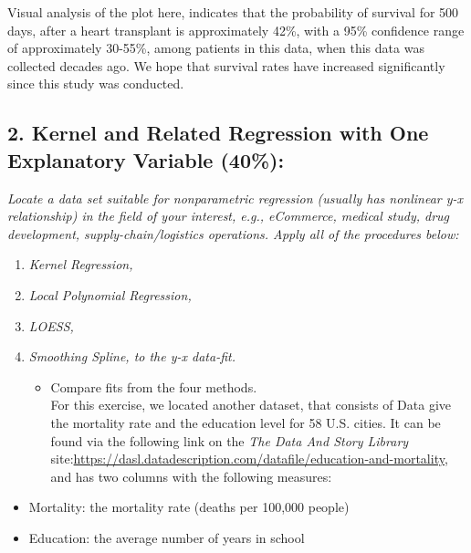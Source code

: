 \documentclass[]{article}
\providecommand{\tightlist}{%
  \setlength{\itemsep}{0pt}\setlength{\parskip}{0pt}}
\begin{document}
Visual analysis of the plot here, indicates that the probability of
survival for 500 days, after a heart transplant is approximately 42\%,
with a 95\% confidence range of approximately 30-55\%, among patients in
this data, when this data was collected decades ago. We hope that
survival rates have increased significantly since this study was
conducted.

\subsection{2. Kernel and Related Regression with One Explanatory
Variable
(40\%):}\label{kernel-and-related-regression-with-one-explanatory-variable-40}

\emph{Locate a data set suitable for nonparametric regression (usually
has nonlinear y-x relationship) in the field of your interest, e.g.,
eCommerce, medical study, drug development, supply-chain/logistics
operations. Apply all of the procedures below:}

\begin{enumerate}
\def\labelenumi{\arabic{enumi})}
\tightlist
\item
  \emph{Kernel Regression,}\\
\item
  \emph{Local Polynomial Regression,}\\
\item
  \emph{LOESS,}\\
\item
  \emph{Smoothing Spline, to the y-x data-fit.}

  \begin{itemize}
  \tightlist
  \item
    Compare fits from the four methods.\\
    For this exercise, we located another dataset, that consists of Data
    give the mortality rate and the education level for 58 U.S. cities.
    It can be found via the following link on the \emph{The Data And
    Story Library}
    site:\url{https://dasl.datadescription.com/datafile/education-and-mortality},
    and has two columns with the following measures:
  \end{itemize}
\end{enumerate}

\begin{itemize}
\tightlist
\item
  Mortality: the mortality rate (deaths per 100,000 people)
\item
  Education: the average number of years in school
\end{itemize}
\end{document}

